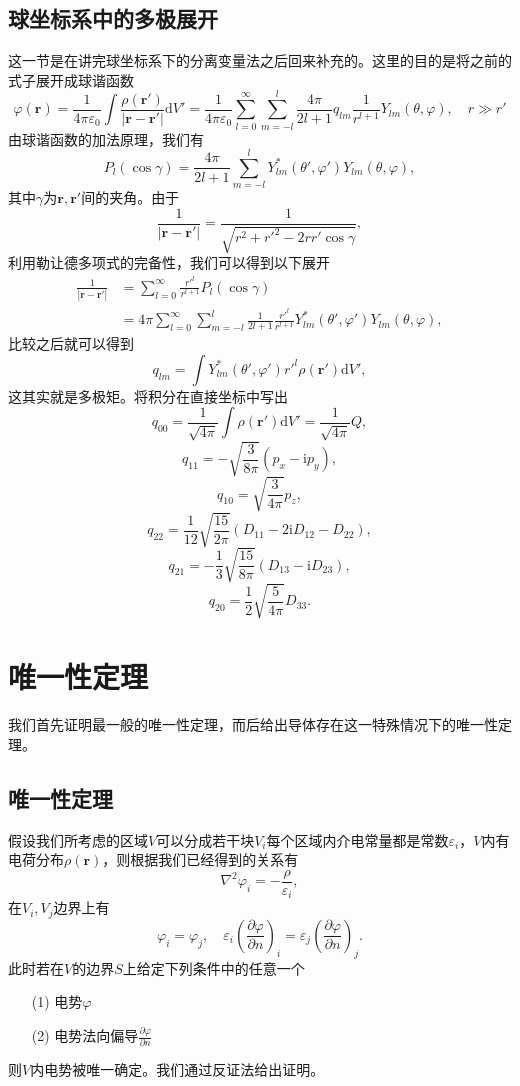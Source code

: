 \documentclass[UTF8]{ctexbook}
\renewcommand{\d}{\mathrm{d}}
\renewcommand{\b}{\boldsymbol}
\renewcommand{\i}{\mathrm{i}}
\renewcommand{\k}{\frac{1}{4\pi\varepsilon_0}}
\numberwithin{equation}{chapter}
\begin{document}
	\subsection{球坐标系中的多极展开}
	这一节是在讲完球坐标系下的分离变量法之后回来补充的。这里的目的是将之前的式子展开成球谐函数
	\[\varphi(\b{r})=\k\int \frac{\rho(\b{r}')}{|\b{r}-\b{r}'|}\d V'=\k\sum_{l=0}^\infty \sum_{m=-l}^{l}\frac{4\pi}{2l+1}q_{lm}\frac{1}{r^{l+1}}Y_{lm}(\theta,\varphi),\quad r\gg r'\]
	由球谐函数的加法原理，我们有
	\[P_l(\cos\gamma)=\frac{4\pi}{2l+1}\sum_{m=-l}^l Y_{lm}^*(\theta',\varphi')Y_{lm}(\theta,\varphi),\]
	其中$\gamma$为$\b{r},\b{r}'$间的夹角。由于
	\[\frac{1}{|\b{r}-\b{r}'|}=\frac{1}{\sqrt{r^2+r'^2-2rr'\cos\gamma}},\]
	利用勒让德多项式的完备性，我们可以得到以下展开
	\begin{align*}
		\frac{1}{|\b{r}-\b{r}'|}&=\sum_{l=0}^\infty \frac{r'^l}{r^{l+1}}P_l(\cos \gamma) \\
		&=4\pi\sum_{l=0}^\infty \sum_{m=-l}^{l}\frac{1}{2l+1}\frac{r'^l}{r^{l+1}}Y_{lm}^*(\theta',\varphi')Y_{lm}(\theta,\varphi),
	\end{align*}
	比较之后就可以得到
	\[q_{lm}=\int Y_{lm}^*(\theta',\varphi')r'^l\rho(\b{r}')\d V',\]
	这其实就是多极矩。将积分在直接坐标中写出
	\[q_{00}=\frac{1}{\sqrt{4\pi}}\int\rho(\b{r}')\d V'=\frac{1}{\sqrt{4\pi}}Q,\]
	\[q_{11}=-\sqrt{\frac{3}{8\pi}}(p_x-\i p_y),\]
	\[q_{10}=\sqrt{\frac{3}{4\pi}}p_z,\]
	\[q_{22}=\frac{1}{12}\sqrt{\frac{15}{2\pi}}(D_{11}-2\i D_{12}-D_{22}),\]
	\[q_{21}=-\frac{1}{3}\sqrt{\frac{15}{8\pi}}(D_{13}-\i D_{23}),\]
	\[q_{20}=\frac{1}{2}\sqrt{\frac{5}{4\pi}}D_{33}.\]
	
	\section{唯一性定理}
	我们首先证明最一般的唯一性定理，而后给出导体存在这一特殊情况下的唯一性定理。
	\subsection{唯一性定理}
	假设我们所考虑的区域$V$可以分成若干块$V_i$每个区域内介电常量都是常数$\varepsilon_i$，$V$内有电荷分布$\rho(\b{r})$，则根据我们已经得到的关系有
	\[\nabla^2\varphi_i=-\frac{\rho}{\varepsilon_i},\]
	在$V_i,V_j$边界上有
	\[\varphi_i=\varphi_j,\quad \varepsilon_i\left(\frac{\partial \varphi}{\partial n}\right)_i=\varepsilon_j\left(\frac{\partial \varphi}{\partial n}\right)_j.\]
	此时若在$V$的边界$S$上给定下列条件中的任意一个
	\begin{itemize}
		\item[(1)]电势$\varphi$
		\item[(2)]电势法向偏导$\frac{\partial \varphi}{\partial n}$
	\end{itemize}
	则$V$内电势被唯一确定。我们通过反证法给出证明。
	
\end{document}
